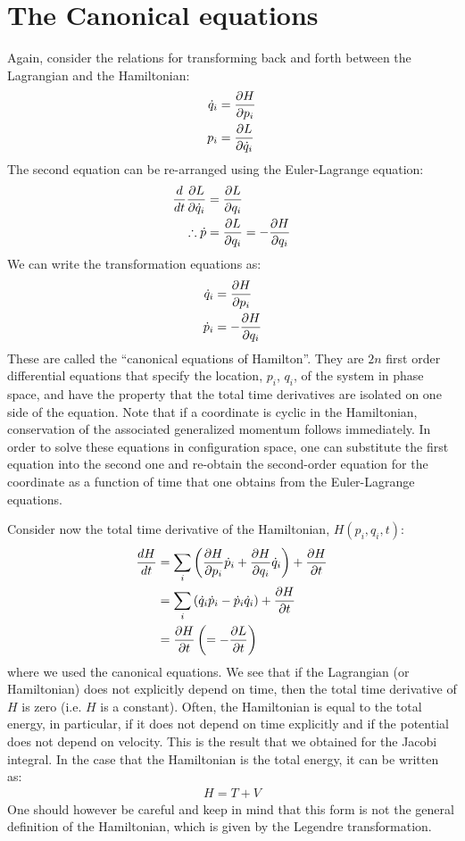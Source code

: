 \section{The Canonical equations}
Again, consider the relations for transforming back and forth between the Lagrangian and the Hamiltonian:
\begin{align}
\dot q_i&=\frac{\partial H}{\partial p_i} \nonumber\\
p_i &= \frac{\partial L}{\partial \dot q_i} 
\end{align}
The second equation can be re-arranged using the Euler-Lagrange equation:
\begin{align}
\frac{d}{dt}\frac{\partial L}{\partial \dot q_i}&=\frac{\partial L}{\partial q_i}\nonumber\\
\therefore \dot p&=\frac{\partial L}{\partial q_i}= -\frac{\partial H}{\partial q_i}
\end{align}
We can write the transformation equations as:
\begin{align}
\dot q_i&=\frac{\partial H}{\partial p_i} \nonumber\\
\dot p_i &= -\frac{\partial H}{\partial q_i}
\end{align}
These are called the ``canonical equations of Hamilton''. They are $2n$ first order differential equations that specify the location, $p_i$, $q_i$, of the system in phase space, and have the property that the total time derivatives are isolated on one side of the equation. Note that if a coordinate is cyclic in the Hamiltonian, conservation of the associated generalized momentum follows immediately. In order to solve these equations in configuration space, one can substitute the first equation into the second one and re-obtain the second-order equation for the coordinate as a function of time that one obtains from the Euler-Lagrange equations.

Consider now the total time derivative of the Hamiltonian, $H(p_i,q_i,t)$:
\begin{align}
\frac{dH}{dt}&= \sum_i\left(\frac{\partial H}{\partial p_i}\dot p_i +\frac{\partial H}{\partial q_i}\dot q_i  \right)+\frac{\partial H}{\partial t}\nonumber\\
&= \sum_i\left(\dot q_i\dot p_i -\dot p_i\dot q_i  \right)+\frac{\partial H}{\partial t}\nonumber\\
&= \frac{\partial H}{\partial t} \left(=-\frac{\partial L}{\partial t}\right)
\end{align}
where we used the canonical equations. We see that if the Lagrangian (or Hamiltonian) does not explicitly depend on time, then the total time derivative of $H$ is zero (i.e. $H$ is a constant). Often, the Hamiltonian is equal to the total energy, in particular, if it does not depend on time explicitly and if the potential does not depend on velocity. This is the result that we obtained for the Jacobi integral. In the case that the Hamiltonian is the total energy, it can be written as:
\begin{align}
H=T+V
\end{align}
One should however be careful and keep in mind that this form is not the general definition of the Hamiltonian, which is given by the Legendre transformation.


